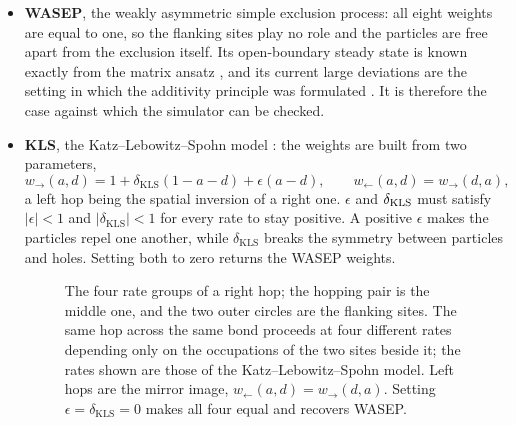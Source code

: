 \documentclass[11pt]{article}
\begin{document}
\begin{itemize}
\item \textbf{WASEP}, the weakly asymmetric simple exclusion process: all eight weights are equal to one, so the flanking sites play no role and the particles are free apart from the exclusion itself. Its open-boundary steady state is known exactly from the matrix ansatz \cite{derrida1993exact}, and its current large deviations are the setting in which the additivity principle was formulated \cite{bodineau2004current}. It is therefore the case against which the simulator can be checked.
\item \textbf{KLS}, the Katz--Lebowitz--Spohn model \cite{katz1984nonequilibrium}: the weights are built from two parameters,
\begin{equation}
    w_\rightarrow(a,d) = 1 + \delta_{\text{KLS}}(1 - a - d) + \epsilon (a - d), \qquad w_\leftarrow(a,d) = w_\rightarrow(d,a),
\end{equation}
a left hop being the spatial inversion of a right one. $\epsilon$ and $\delta_{\rm KLS}$ must satisfy $|\epsilon| < 1$ and $|\delta_{\text{KLS}}| < 1$ for every rate to stay positive. A positive $\epsilon$ makes the particles repel one another, while $\delta_{\text{KLS}}$ breaks the symmetry between particles and holes. Setting both to zero returns the WASEP weights.
\begin{figure}[htbp]
\centering
{}
\caption{The four rate groups of a right hop; the hopping pair is the middle one, and the two outer circles are the flanking sites. The same hop across the same bond proceeds at four different rates depending only on the occupations of the two sites beside it; the rates shown are those of the Katz--Lebowitz--Spohn model. Left hops are the mirror image, $w_\leftarrow(a,d) = w_\rightarrow(d,a)$. Setting $\epsilon = \delta_{\text{KLS}} = 0$ makes all four equal and recovers WASEP.}
\label{fig:classes}
\end{figure}
\end{itemize}
\end{document}
